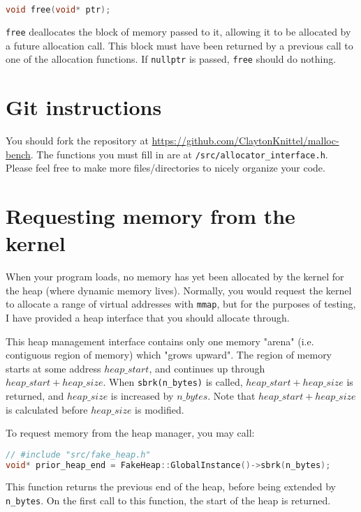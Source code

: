 \documentclass{article}
\begin{document}
\begin{lstlisting}[language=C++]
void free(void* ptr);
\end{lstlisting}

\texttt{free} deallocates the block of memory passed to it, allowing it to be allocated by a future allocation call. This block must have been returned by a previous call to one of the allocation functions. If \texttt{nullptr} is passed, \texttt{free} should do nothing.

\section*{Git instructions}

You should fork the repository at \url{https://github.com/ClaytonKnittel/malloc-bench}. The functions you must fill in are at \texttt{/src/allocator\_interface.h}. Please feel free to make more files/directories to nicely organize your code.

\section*{Requesting memory from the kernel}

When your program loads, no memory has yet been allocated by the kernel for the heap (where dynamic memory lives). Normally, you would request the kernel to allocate a range of virtual addresses with \texttt{mmap}, but for the purposes of testing, I have provided a heap interface that you should allocate through.

This heap management interface contains only one memory "arena" (i.e. contiguous region of memory) which "grows upward". The region of memory starts at some address $heap\_start$, and continues up through $heap\_start+heap\_size$. When \texttt{sbrk(n\_bytes)} is called, $heap\_start+heap\_size$ is returned, and $heap\_size$ is increased by $n\_bytes$. Note that $heap\_start+heap\_size$ is calculated before $heap\_size$ is modified.

To request memory from the heap manager, you may call:

\begin{lstlisting}[language=C++]
// #include "src/fake_heap.h"
void* prior_heap_end = FakeHeap::GlobalInstance()->sbrk(n_bytes);
\end{lstlisting}

This function returns the previous end of the heap, before being extended by \texttt{n\_bytes}. On the first call to this function, the start of the heap is returned.
\end{document}
